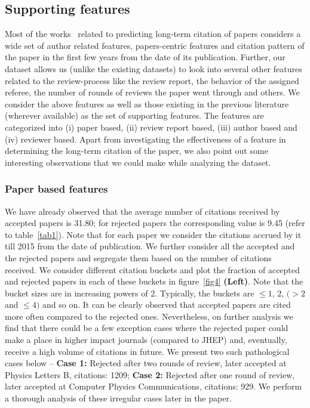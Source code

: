 \noindent
\subsection{Supporting features}
Most of the works~\cite{yan2012better,chakraborty2014towards} related to predicting long-term citation of papers considers a wide set of author related features, papers-centric features and citation pattern of the paper in the first few years from the date of its publication. 
Further, our dataset allows us (unlike the existing datasets) to look into several other features related to the review-process like the review report, the behavior of the assigned referee, the number of rounds of reviews the paper went through and others. 
We consider the above features as well as those existing in the previous literature (wherever available) as the set of supporting features. The features are categorized into (i) paper based, (ii) review report based, (iii) author based and (iv) reviewer based. Apart from investigating the effectiveness of a feature in determining the long-term citation of the paper, we also point out some interesting observations that we could make while analyzing the dataset.    

\subsubsection{Paper based features}
\label{analysis}
We have already observed that the average number of citations received by accepted papers is 31.80; for rejected papers the corresponding value is 9.45 (refer to table~\ref{tab1}). Note that for each paper we consider the citations accrued by it till 2015 from the date of publication.
We further consider all the accepted and the rejected papers and segregate them based on the number of citations received. We consider different citation buckets and plot the fraction of accepted and rejected papers in each of these buckets in figure~\ref{fig4} {\bf (Left)}. Note that the bucket sizes are in increasing powers of 2. Typically, the buckets are $\leq 1$, $2$, $(>2$ and $\leq 4)$ and so on. It can be clearly observed that accepted papers are cited more often compared to the rejected ones. Nevertheless, on further analysis we find that there could be a few exception cases where the rejected paper could make a place in higher impact journals (compared to JHEP) and, eventually, receive a high volume of citations in future. We present two such pathological cases below -- {\bf Case 1:} Rejected after two rounds of review, later accepted at Physics Letters B, citations: 1209; {\bf Case 2:} Rejected after one round of review, later accepted at Computer Physics Communications, citations: 929. We perform a thorough analysis of these irregular cases later in the paper.



